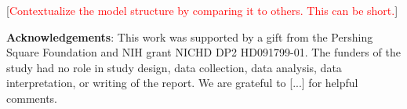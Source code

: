 \documentclass[11pt]{article}
\newcommand{\comments}[1]{[\textcolor{red}{#1}]}
\begin{document}
\comments{Contextualize the model structure by comparing it to others. This can be short.} 




\noindent \textbf{Acknowledgements}:
This work was supported by a gift from the Pershing Square Foundation and NIH grant NICHD DP2 HD091799-01. The funders of the study had no role in study design, data collection, data analysis, data interpretation, or writing of the report.  We are grateful to [...]
for helpful comments.







\end{document}
